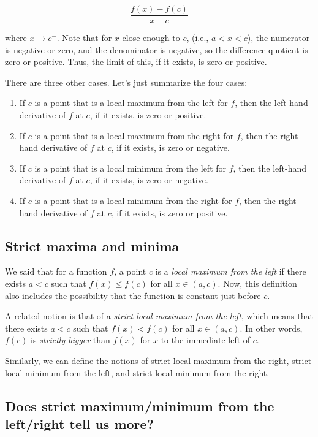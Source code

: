 \documentclass{amsart}
\begin{document}
$$\frac{f(x) - f(c)}{x - c}$$

where $x \to c^-$. Note that for $x$ close enough to $c$, (i.e., $a <
x < c$), the numerator is negative or zero, and the denominator is
negative, so the difference quotient is zero or positive. Thus, the
limit of this, if it exists, is zero or positive.

There are three other cases. Let's just summarize the four cases:

\begin{enumerate}
\item If $c$ is a point that is a local maximum from the left for $f$,
  then the left-hand derivative of $f$ at $c$, if it exists, is zero
  or positive.
\item If $c$ is a point that is a local maximum from the right for
  $f$, then the right-hand derivative of $f$ at $c$, if it exists, is
  zero or negative.
\item If $c$ is a point that is a local minimum from the left for $f$,
  then the left-hand derivative of $f$ at $c$, if it exists, is zero
  or negative.
\item If $c$ is a point that is a local minimum from the right for
  $f$, then the right-hand derivative of $f$ at $c$, if it exists, is
  zero or positive.
\end{enumerate}

\subsection{Strict maxima and minima}

We said that for a function $f$, a point $c$ is a {\em local maximum
from the left} if there exists $a < c$ such that $f(x) \le f(c)$ for
all $x \in (a,c)$. Now, this definition also includes the possibility
that the function is constant just before $c$.

A related notion is that of a {\em strict local maximum from the
left}, which means that there exists $a < c$ such that $f(x) < f(c)$
for all $x \in (a,c)$. In other words, $f(c)$ is {\em strictly bigger}
than $f(x)$ for $x$ to the immediate left of $c$.

Similarly, we can define the notions of strict local maximum from the
right, strict local minimum from the left, and strict local minimum
from the right.

\subsection{Does strict maximum/minimum from the left/right tell us more?}
\end{document}
